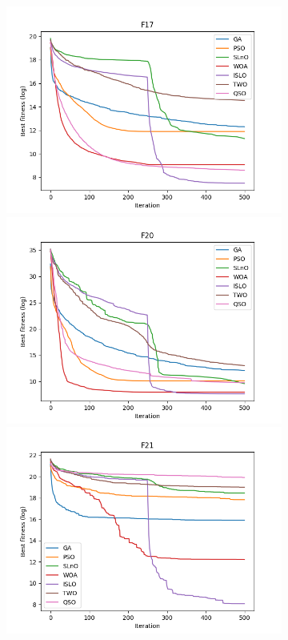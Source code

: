 \documentclass[a4paper,13pt,2p]{report}
\begin{document}
\begin{figure}[!ht] 
   \centering
   \begin{subfigure}{0.49\textwidth}
   	\includegraphics[width=1\linewidth]{png/convergence/islo_hybrid_F17}
  	 \includegraphics[width=1\linewidth]{png/convergence/islo_hybrid_F20}
  	 \includegraphics[width=1\linewidth]{png/convergence/islo_hybrid_F21}

\end{subfigure}
\end{figure}
\end{document}
